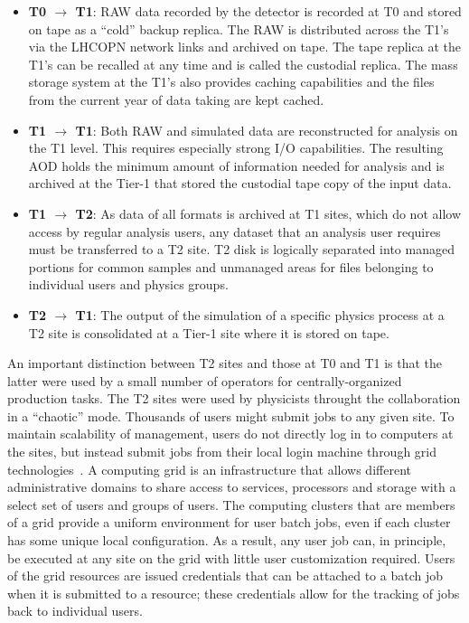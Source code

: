 \begin{itemize}
\item {\bf T0 $\to$ T1}: RAW data recorded by the detector is recorded at
  T0 and stored on tape as a ``cold'' backup replica. The RAW is
  distributed across the T1's via the LHCOPN network links and archived on
  tape. The tape replica at the T1's can be recalled at any time and is
  called the custodial replica. The mass storage system at the T1's also
  provides caching capabilities and the files from the current year of data
  taking are kept cached.

\item {\bf T1 $\to$ T1}: Both RAW and simulated data are reconstructed for
  analysis on the T1 level. This requires especially strong I/O
  capabilities. The resulting AOD holds the minimum amount of information
  needed for analysis and is archived at the Tier-1 that stored the
  custodial tape copy of the input data.

\item {\bf T1 $\to$ T2}: As data of all formats is archived at T1 sites,
  which do not allow access by regular analysis users, any dataset that an
  analysis user requires must be transferred to a T2 site.  T2 disk is
  logically separated into managed portions for common samples and
  unmanaged areas for files belonging to individual users and physics
  groups.

\item {\bf T2 $\to$ T1}: The output of the simulation of a specific physics
  process at a T2 site is consolidated at a Tier-1 site where it is stored
  on tape.
\end{itemize}


An important distinction between T2 sites and those at T0 and T1 is that
the latter were used by a small number of operators for centrally-organized
production tasks.  The T2 sites were used by physicists throught the
collaboration in a ``chaotic'' mode.  Thousands of users might submit jobs
to any given site.  To maintain scalability of management, users do not
directly log in to computers at the sites, but instead submit jobs from
their local login machine through grid technologies~\cite{thegrid}.  A
computing grid is an infrastructure that allows different administrative
domains to share access to services, processors and storage with a select
set of users and groups of users. The computing clusters that are members
of a grid provide a uniform environment for user batch jobs, even if each
cluster has some unique local configuration.  As a result, any user job
can, in principle, be executed at any site on the grid with little user
customization required.  Users of the grid resources are issued credentials
that can be attached to a batch job when it is submitted to a resource;
these credentials allow for the tracking of jobs back to individual users.

